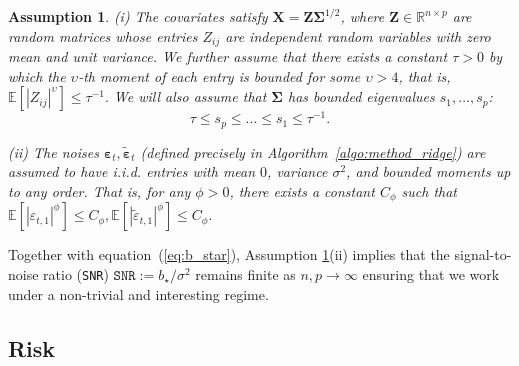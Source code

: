 \documentclass[10pt]{article}
\def\eqref#1{equation~(\ref{#1})}
\newcommand{\R}{\mathbb{R}}
\newtheorem{ass}{Assumption}
\numberwithin{thm}{section}
\numberwithin{remark}{section}
\numberwithin{ex}{section}
\numberwithin{ass}{section}
\numberwithin{defn}{section}
\numberwithin{lemma}{section}
\numberwithin{corollary}{section}
\numberwithin{prop}{section}
\newcommand{\ee}{\mathbb{E}}
\newcommand{\bX}{ { X} }
\newcommand{\bZ}{ { Z} }
\def \bX{\mathbf{X}}
\def \bZ{\mathbf{Z}}
\newcommand{\bSigma}{ { \Sigma} }
\def\bSigma{{\boldsymbol\Sigma}}
\numberwithin{equation}{section}
\renewcommand{\tilde}{\widetilde}
\begin{document}
\begin{ass}\label{assn:combined}
  (i) The covariates satisfy $\bX= \bZ \bSigma^{1/2}$, where $\bZ \in \R^{n \times p}$ are random matrices whose entries $Z_{ij}$ are independent random variables with zero mean and unit variance. We further assume that there exists a constant $\tau>0$ by which the $\upsilon$-th moment of each entry is bounded for some $\upsilon>4$, that is,
  $\ee\left[\left|Z_{ij}\right|^\upsilon\right] \leq \tau^{-1}.$
  We will also assume that $\bSigma$ has bounded eigenvalues $s_1,\ldots,s_p$:
  \begin{equation}\label{eqn:eigenvalue_bounded}
    \tau \leq s_p \leq ... \leq s_1 \leq \tau^{-1}.
  \end{equation}

  (ii) The noises ${\boldsymbol{\varepsilon}}_t, \tilde {\boldsymbol{\varepsilon}}_t$ (defined precisely in Algorithm~\ref{algo:method_ridge}) are assumed to have i.i.d. entries with mean $0$, variance $\sigma^2$, and bounded moments up to any order. That is, for any $\phi>0$, there exists a constant $C_\phi$ such that
  $\mathbb {E}\left[\left|\varepsilon_{t,1}\right|^\phi\right] \leq C_\phi, \mathbb {E}\left[\left|\tilde \varepsilon_{t,1}\right|^\phi\right] \leq C_\phi.$
\end{ass}
Together with \eqref{eq:b_star}, Assumption \ref{assn:combined}(ii) implies that the signal-to-noise ratio (\texttt{SNR}) $\texttt{SNR}:= b_\star/\sigma^2$ remains finite as $n,p \rightarrow \infty$ ensuring that we work under a non-trivial and interesting regime.

\subsection{Risk}
\end{document}
